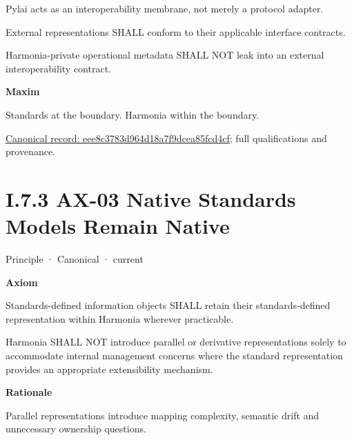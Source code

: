 Pylai acts as an interoperability membrane, not merely a protocol
adapter.



External representations SHALL conform to their applicable interface
contracts.



Harmonia-private operational metadata SHALL NOT leak into an external
interoperability contract.



\par\medskip\textbf{Maxim}\par


Standards at the boundary. Harmonia within the boundary.


{\footnotesize \href{../../../../continuum/motivation/principle/eee8c3783d964d18a7f9dcea85fcd4cf.md}{Canonical record: eee8c3783d964d18a7f9dcea85fcd4cf}; full qualifications and provenance.}\par
\section*{I.7.3 AX-03 Native Standards Models Remain Native}
\label{navigation:I.7.3}

\label{element:e99a4e2bf99f476d876394300d6b9c3d}
{\small Principle · Canonical · current}\par

\par\medskip\textbf{Axiom}\par


Standards-defined information objects SHALL retain their
standards-defined representation within Harmonia wherever practicable.



Harmonia SHALL NOT introduce parallel or derivative representations
solely to accommodate internal management concerns where the standard
representation provides an appropriate extensibility mechanism.



\par\medskip\textbf{Rationale}\par


Parallel representations introduce mapping complexity, semantic drift
and unnecessary ownership questions.



